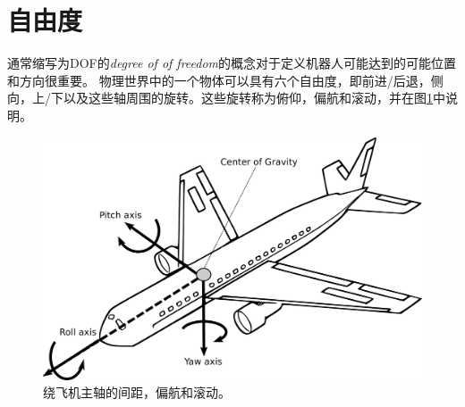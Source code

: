 \section{自由度}\label{sec:dof}


通常缩写为DOF的\emph{degree of of freedom}的概念对于定义机器人可能达到的可能位置和方向很重要。 物理世界中的一个物体可以具有六个自由度，即前进/后退，侧向，上/下以及这些轴周围的旋转。这些旋转称为俯仰，偏航和滚动，并在图\ref{fig:pitchyawandroll}中说明。

\begin{figure}
	\centering
		\includegraphics[width=\textwidth]{figs/pitchyawroll.png}
	\caption{绕飞机主轴的间距，偏航和滚动。}
	\label{fig:pitchyawandroll}
\end{figure}


